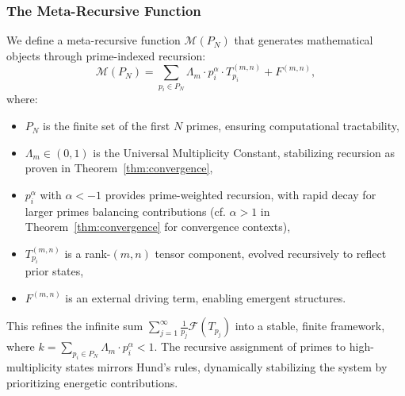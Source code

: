 \documentclass[12pt]{article}
\begin{document}
\subsubsection{The Meta-Recursive Function}
We define a meta-recursive function \(\mathcal{M}(P_N)\) that generates mathematical objects through prime-indexed recursion:
\begin{equation}
    \mathcal{M}(P_N) = \sum_{p_i \in P_N} \Lambda_m \cdot p_i^\alpha \cdot T_{p_i}^{(m,n)} + F^{(m,n)},
\end{equation}
where:
\begin{itemize}
    \item \(P_N\) is the finite set of the first \(N\) primes, ensuring computational tractability,
    \item \(\Lambda_m \in (0, 1)\) is the Universal Multiplicity Constant, stabilizing recursion as proven in Theorem~\ref{thm:convergence},
    \item \(p_i^\alpha\) with \(\alpha < -1\) provides prime-weighted recursion, with rapid decay for larger primes balancing contributions (cf. \(\alpha > 1\) in Theorem~\ref{thm:convergence} for convergence contexts),
    \item \(T_{p_i}^{(m,n)}\) is a rank-$(m,n)$ tensor component, evolved recursively to reflect prior states,
    \item \(F^{(m,n)}\) is an external driving term, enabling emergent structures.
\end{itemize}
This refines the infinite sum \(\sum_{j=1}^\infty \frac{1}{p_j} \mathcal{F}(T_{p_j})\) into a stable, finite framework, where \(k = \sum_{p_i \in P_N} \Lambda_m \cdot p_i^\alpha < 1\). The recursive assignment of primes to high-multiplicity states mirrors Hund’s rules, dynamically stabilizing the system by prioritizing energetic contributions.
\end{document}
